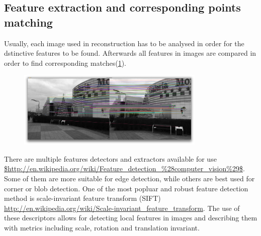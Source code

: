 \subsection{Feature extraction and corresponding points matching}
Usually, each image used in reconstruction has to be analysed in order for the dstinctive features to be found. Afterwards all features in images are compared in order to find corresponding matches(\ref{fig:correspondingMatches}).
\begin{figure}[p]
    \centering
    \includegraphics[width=0.8\textwidth]{correspondingMatching}
    \caption{}
    \label{fig:correspondingMatches}
\end{figure}
There are multiple features detectors and extractors available for use \url{$http://en.wikipedia.org/wiki/Feature_detection_%28computer_vision%29$}. Some of them are more suitable for edge detection, while others are best used for corner or blob detection. One of the most popluar and robust feature detection method is scale-invariant feature transform (SIFT) \url{http://en.wikipedia.org/wiki/Scale-invariant_feature_transform}. The use of these descriptors allows for detecting local features in images and describing them with metrics including scale, rotation and translation invariant.
